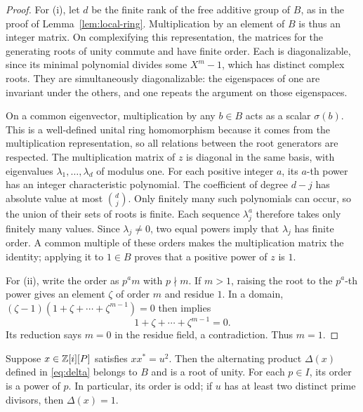 \begin{proof}
For (i), let \(d\) be the finite rank of the free additive group of
\(B\), as in the proof of Lemma~\ref{lem:local-ring}. Multiplication by an element
of \(B\) is thus an integer matrix. On complexifying this
representation, the matrices for the generating roots of unity
commute and have finite order. Each is diagonalizable, since its
minimal polynomial divides some \(X^m-1\), which has distinct complex
roots. They are simultaneously diagonalizable: the eigenspaces of one
are invariant under the others, and one repeats the argument on those
eigenspaces.

On a common eigenvector, multiplication by any \(b\in B\) acts as a
scalar \(\sigma(b)\). This is a well-defined unital ring homomorphism
because it comes from the multiplication representation, so all
relations between the root generators are respected. The multiplication
matrix of \(z\) is diagonal in the same basis, with eigenvalues
\(\lambda_1,\ldots,\lambda_d\) of modulus one. For each positive
integer \(a\), its \(a\)-th power has an integer characteristic
polynomial. The coefficient of degree \(d-j\) has absolute value at
most \(\binom dj\). Only finitely many such polynomials can occur,
so the union of their sets of roots is finite. Each sequence
\(\lambda_j^a\) therefore takes only finitely many values. Since
\(\lambda_j\ne0\), two equal powers imply that \(\lambda_j\) has
finite order. A common multiple of these
orders makes the multiplication matrix the identity; applying it to
\(1\in B\) proves that a positive power of \(z\) is \(1\).

For (ii), write the order as \(p^a m\) with \(p\nmid m\). If \(m>1\),
raising the root to the \(p^a\)-th power gives an element \(\zeta\)
of order \(m\) and residue \(1\). In a domain,
\((\zeta-1)(1+\zeta+\cdots+\zeta^{m-1})=0\) then implies
\[
 1+\zeta+\cdots+\zeta^{m-1}=0.
\]
Its reduction says \(m=0\) in the residue field, a contradiction.
Thus \(m=1\).
\end{proof}

\begin{proposition}\label{prop:alternating}
Suppose \(x\in\mathbb Z[i][P]\) satisfies \(xx^*=u^2\). Then the alternating
product \(\Delta(x)\) defined in \eqref{eq:delta} belongs to \(B\) and
is a root of unity. For each \(p\in I\), its order is a power of \(p\).
In particular, its order is odd; if \(u\) has at least two distinct
prime divisors, then \(\Delta(x)=1\).
\end{proposition}

